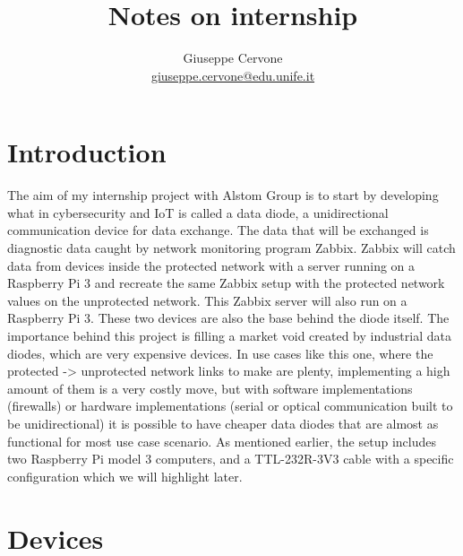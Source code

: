 \documentclass[a4paper,11pt]{scrartcl}
\title{Notes on internship}
\date{}
\author{Giuseppe Cervone\\ \url{giuseppe.cervone@edu.unife.it}}
\begin{document}
\maketitle

\section{Introduction}
The aim of my internship project with Alstom Group is to start by developing what in cybersecurity and IoT is called a data diode, a unidirectional communication device for data exchange.
The data that will be exchanged is diagnostic data caught by network monitoring program Zabbix. Zabbix will catch data from devices inside the protected network with a server running on a Raspberry Pi 3 and recreate the same Zabbix setup with the protected network values on the unprotected network. This Zabbix server will also run on a Raspberry Pi 3. These two devices are also the base behind the diode itself. 
The importance behind this project is filling a market void created by industrial data diodes, which are very expensive devices. In use cases like this one, where the protected -> unprotected network links to make are plenty, implementing a high amount of them is a very costly move, but with software implementations (firewalls) or hardware implementations (serial or optical communication built to be unidirectional) it is possible to have cheaper data diodes that are almost as functional for most use case scenario. As mentioned earlier, the setup includes two Raspberry Pi model 3 computers, and a TTL-232R-3V3 cable with a specific configuration which we will highlight later.

\section{Devices}
\end{document}
